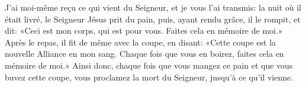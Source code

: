 J’ai moi-même reçu ce qui vient du Seigneur, et je vous l’ai transmis:
	la nuit où il était livré, le Seigneur Jésus prit du pain,
	puis, ayant rendu grâce, il le rompit, et dit:
	«Ceci est mon corps, qui est pour vous. Faites cela en mémoire de moi.»
Après le repas, il fit de même avec la coupe, en disant:
	«Cette coupe est la nouvelle Alliance en mon sang.
	Chaque fois que vous en boirez, faites cela en mémoire de moi.»
Ainsi donc, chaque fois que vous mangez ce pain et que vous buvez cette coupe,
	vous proclamez la mort du Seigneur, jusqu’à ce qu’il vienne.

